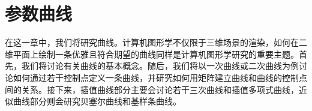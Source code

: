 \chapter{参数曲线}

在这一章中，我们将研究曲线。计算机图形学不仅限于三维场景的渲染，如何在二维平面上绘制一条优雅且符合期望的曲线同样是计算机图形学研究的重要主题。首先，我们将讨论有关曲线的基本概念。随后，我们将以一次曲线或二次曲线为例讨论如何通过若干控制点定义一条曲线，并研究如何用矩阵建立曲线和曲线的控制点间的关系。接下来，插值曲线部分主要会讨论若干三次曲线和插值多项式曲线，近似曲线部分则会研究贝塞尔曲线和基样条曲线。





